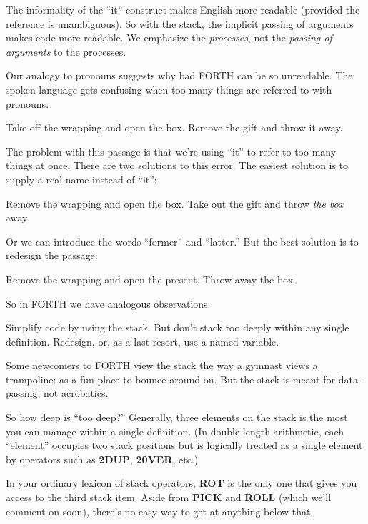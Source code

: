 The informality of the ``it'' construct makes English more readable
(provided the reference is unambiguous). So with the stack, the implicit
passing of arguments makes code more readable. We emphasize the
\emph{processes}, not the \emph{passing of arguments} to the processes.

Our analogy to pronouns suggests why bad FORTH can be so unreadable.
The spoken language gets confusing when too many things are
referred to with pronouns.

\begin{tfquot}
Take off the wrapping and open the box. Remove the gift and throw it
away.
\end{tfquot}
The problem with this passage is that we're using ``it'' to refer to too
many things at once. There are two solutions to this error. The easiest
solution is to supply a real name instead of ``it'':

\begin{tfquot}
Remove the wrapping and open the box. Take out the gift and throw
\emph{the box} away.
\end{tfquot}
Or we can introduce the words ``former'' and ``latter.'' But the best
solution is to redesign the passage:

\begin{tfquot}
Remove the wrapping and open the present. Throw away the box.
\end{tfquot}
So in FORTH we have analogous observations:

\begin{tip}
Simplify code by using the stack. But don't stack too deeply within any
single definition. Redesign, or, as a last resort, use a named variable.
\end{tip}
Some newcomers to FORTH view the stack the way a gymnast views a
trampoline: as a fun place to bounce around on. But the stack is meant for
data-passing, not acrobatics.

So how deep is ``too deep?'' Generally, three elements on the stack is
the most you can manage within a single definition. (In double-length
arithmetic, each ``element'' occupies two stack positions but is logically
treated as a single element by operators such as \textbf{2DUP}, \textbf{20VER},
etc.)

In your ordinary lexicon of stack operators, \textbf{ROT} is the only one
that gives you access to the third stack item. Aside from \textbf{PICK} and
\textbf{ROLL} (which we'll comment on soon), there's no easy way to get at
anything below that.

